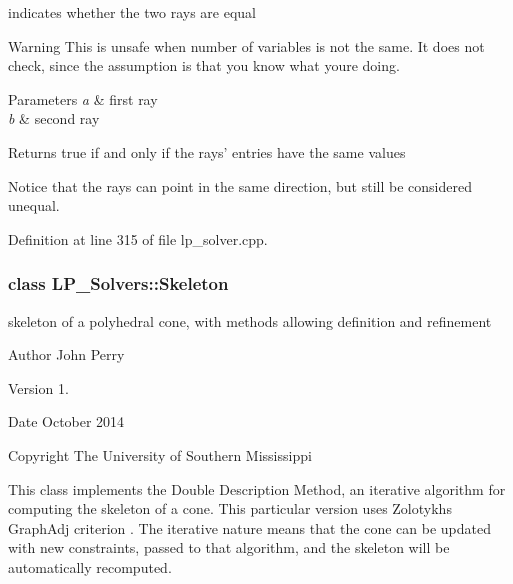 indicates whether the two rays are equal 

\begin{DoxyWarning}{Warning}
This is unsafe when number of variables is not the same. It does not check, since the assumption is that you know what you\textquotesingle{}re doing. 
\end{DoxyWarning}

\begin{DoxyParams}{Parameters}
{\em a} & first ray \\
\hline
{\em b} & second ray \\
\hline
\end{DoxyParams}
\begin{DoxyReturn}{Returns}
{\ttfamily true} if and only if the rays' entries have the same values
\end{DoxyReturn}
Notice that the rays can point in the same direction, but still be considered unequal. 

Definition at line 315 of file lp\+\_\+solver.\+cpp.

\label{class_l_p___solvers_1_1_skeleton}
\subsubsection{class L\+P\+\_\+\+Solvers\+:\+:Skeleton}
skeleton of a polyhedral cone, with methods allowing definition and refinement 

\begin{DoxyAuthor}{Author}
John Perry 
\end{DoxyAuthor}
\begin{DoxyVersion}{Version}
1. 
\end{DoxyVersion}
\begin{DoxyDate}{Date}
October 2014 
\end{DoxyDate}
\begin{DoxyCopyright}{Copyright}
The University of Southern Mississippi
\end{DoxyCopyright}
This class implements the Double Description Method, an iterative algorithm for computing the skeleton of a cone. This particular version uses Zolotykh\textquotesingle{}s Graph\+Adj criterion \cite{Zolotych_DoubleDescription}. The iterative nature means that the cone can be updated with new constraints, passed to that algorithm, and the skeleton will be automatically recomputed. 

